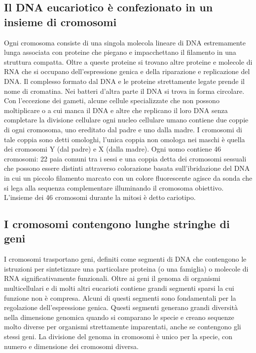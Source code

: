 \subsection{Il DNA eucariotico \`e confezionato in un insieme di cromosomi}
Ogni cromosoma consiste di una singola molecola lineare di DNA estremamente lunga associata con proteine che piegano e impacchettano il filamento in una struttura compatta. Oltre a 
queste proteine si trovano altre proteine e molecole di RNA che si occupano dell'espressione genica e della riparazione e replicazione del DNA. Il complesso formato dal DNA e le proteine
strettamente legate prende il nome di cromatina. Nei batteri d'altra parte il DNA si trova in forma circolare. Con l'eccezione dei gameti, alcune cellule specializzate che non possono
moltiplicare o a cui manca il DNA e altre che replicano il loro DNA senza completare la divisione cellulare ogni nucleo cellulare umano contiene due coppie di ogni cromosoma, uno 
ereditato dal padre e uno dalla madre. I cromosomi di tale coppia sono detti omologhi, l'unica coppia non omologa nei maschi \`e quella dei cromosomi Y (dal padre) e X (dalla madre).
Ogni uomo contiene 46 cromosomi: 22 paia comuni tra i sessi e una coppia detta dei cromosomi sessuali che possono essere distinti attraverso colorazione basata sull'ibridazione del DNA
in cui un piccolo filamento marcato con un colore fluorescente agisce da sonda che si lega alla sequenza complementare illuminando il cromosoma obiettivo. L'insieme dei 46 cromosomi
durante la mitosi \`e detto cariotipo.
\subsection{I cromosomi contengono lunghe stringhe di geni}
I cromosomi trasportano geni, definiti come segmenti di DNA che contengono le istruzioni per sintetizzare una particolare proteina (o una famiglia) o molecole di RNA significativamente 
funzionali. Oltre ai geni il genoma di organismi multicellulari e di molti altri eucarioti contiene grandi segmenti sparsi la cui funzione non \`e compresa. Alcuni di questi segmenti
sono fondamentali per la regolazione dell'espressione genica. Questi segmenti generano grandi diversit\`a nella dimensione genomica quando si comparano le specie e creano sequenze molto
diverse per organismi strettamente imparentati, anche se contengono gli stessi geni. La divisione del genoma in cromosomi \`e unico per la specie, con numero e dimensione dei cromosomi
diversa. 
